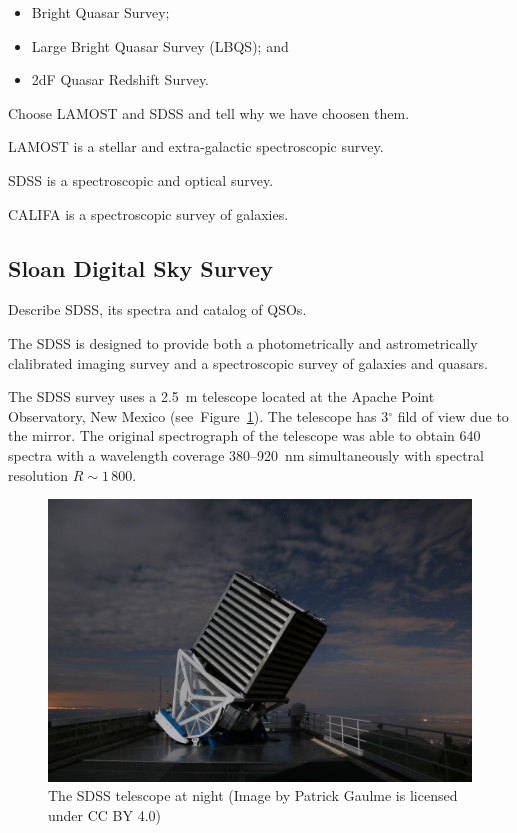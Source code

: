 \begin{itemize}
	\item Bright Quasar Survey;
	\item Large Bright Quasar Survey (LBQS); and
	\item 2dF Quasar Redshift Survey.
\end{itemize}

Choose LAMOST and SDSS and tell why we have choosen them.

LAMOST is a stellar and extra-galactic spectroscopic survey.

SDSS is a spectroscopic and optical survey.

CALIFA is a spectroscopic survey of galaxies.

\subsection{Sloan Digital Sky Survey}

Describe SDSS, its spectra and catalog of QSOs.

The SDSS is designed to provide both a photometrically and astrometrically clalibrated imaging survey
and a spectroscopic survey of galaxies and quasars.~\cite{york2000}

The SDSS survey uses a 2.5~m telescope located at the Apache Point Observatory, New Mexico (see~Figure~\ref{sdss_telescope}).
The telescope has 3\(^{\circ}\) fild of view due to the mirror.
The original spectrograph of the telescope was able to obtain 640 spectra
with a wavelength coverage 380--920~nm simultaneously
with spectral resolution \(R \sim 1\,800\).~\cite{gunn1998, york2000}

\begin{figure}
	\includegraphics[width=\textwidth]{img/sdss_gaulme.jpg}
	\caption{The SDSS telescope at night (Image by Patrick Gaulme is licensed under CC BY 4.0)}
	\label{sdss_telescope}
\end{figure}

